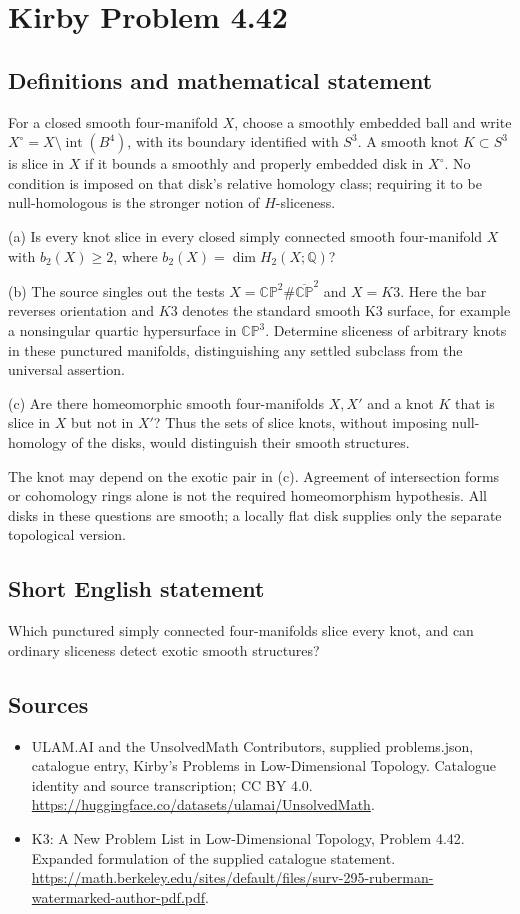 \documentclass[11pt,a4paper]{article}
\begin{document}
\section*{Kirby Problem 4.42}\label{statement}

\subsection{Definitions and mathematical statement}
For a closed smooth four-manifold $X$, choose a smoothly embedded ball and write $X^\circ=X\setminus\operatorname{int}(B^4)$, with its boundary identified with $S^3$. A smooth knot $K\subset S^3$ is slice in $X$ if it bounds a smoothly and properly embedded disk in $X^\circ$. No condition is imposed on that disk's relative homology class; requiring it to be null-homologous is the stronger notion of $H$-sliceness.

(a) Is every knot slice in every closed simply connected smooth four-manifold $X$ with $b_2(X)\ge2$, where $b_2(X)=\dim H_2(X;\mathbb Q)$?

(b) The source singles out the tests $X=\mathbb{CP}^2\#\overline{\mathbb{CP}}^{2}$ and $X=K3$. Here the bar reverses orientation and $K3$ denotes the standard smooth K3 surface, for example a nonsingular quartic hypersurface in $\mathbb{CP}^3$. Determine sliceness of arbitrary knots in these punctured manifolds, distinguishing any settled subclass from the universal assertion.

(c) Are there homeomorphic smooth four-manifolds $X,X'$ and a knot $K$ that is slice in $X$ but not in $X'$? Thus the sets of slice knots, without imposing null-homology of the disks, would distinguish their smooth structures.

The knot may depend on the exotic pair in (c). Agreement of intersection forms or cohomology rings alone is not the required homeomorphism hypothesis. All disks in these questions are smooth; a locally flat disk supplies only the separate topological version.
\subsection{Short English statement}
Which punctured simply connected four-manifolds slice every knot, and can ordinary sliceness detect exotic smooth structures?
\subsection{Sources}
\begin{itemize}
\item[S1] ULAM.AI and the UnsolvedMath Contributors, supplied problems.json, catalogue entry, Kirby's Problems in Low-Dimensional Topology. Catalogue identity and source transcription; CC BY 4.0.
\url{https://huggingface.co/datasets/ulamai/UnsolvedMath}.
\item[S2] K3: A New Problem List in Low-Dimensional Topology, Problem 4.42. Expanded formulation of the supplied catalogue statement.
\url{https://math.berkeley.edu/sites/default/files/surv-295-ruberman-watermarked-author-pdf.pdf}.
\end{itemize}
\end{document}

